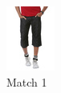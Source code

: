 \begin{figure}[H]
\begin{subfigure}[b]{0.19\textwidth}
      \includegraphics[width=\textwidth]{images/output3.jpeg}
      \caption{Match 1}
  \end{subfigure}
  \begin{subfigure}[b]{0.19\textwidth}

\end{subfigure}
\end{figure}

